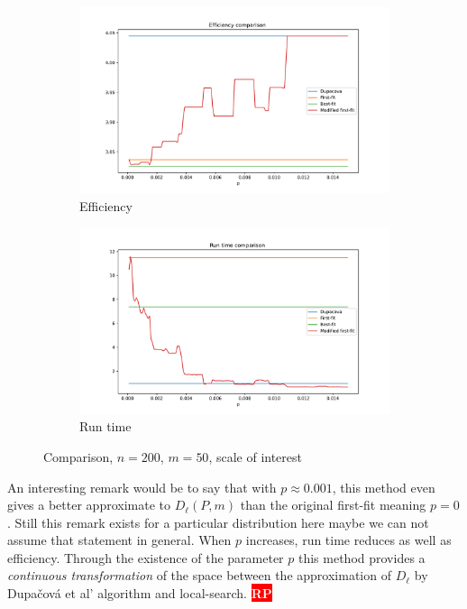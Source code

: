 \documentclass{amsart}
\newcommand{\nb}[3]{
		{\colorbox{#2}{\bfseries\sffamily\tiny\textcolor{white}{#1}}}
		{\textcolor{#2}{\text{$\blacktriangleright$}{\textcolor{#2}{#3}}\text{$\blacktriangleleft$}}}}
\newcommand{\rp}[1]{\nb{RP}{red}{#1}}
\begin{document}
\begin{figure}[ht]
    \centering
    \begin{subfigure}[b]{0.495\textwidth}
        \centering
        \includegraphics[width=1.1\textwidth]{plots/efficiency small scale p.pdf}
        \caption{Efficiency}
    \end{subfigure}
    \hfill
    \begin{subfigure}[b]{0.495\textwidth}
        \centering
        \includegraphics[width=1.1\textwidth]{plots/RUN TIME p small scale.pdf}
        \caption{Run time}
    \end{subfigure}
    \caption{Comparison, $n=200$, $m=50$, scale of interest}
    \label{p small scale}
\end{figure}

An interesting remark would be to say that with $p\approx 0.001$, this method even gives a better approximate to $D_\ell\left(P,m\right)$ than the original first-fit meaning $p=0$. Still this remark exists for a particular distribution here maybe we can not assume that statement in general. When $p$ increases, run time reduces as well as efficiency. Through the existence of the parameter $p$ this method provides a \emph{continuous transformation} of the space between the approximation of $D_\ell$ by Dupačová et al' algorithm and local-search. \rp{mettre en avant cette remarque à mon avis c'est important}
\end{document}
